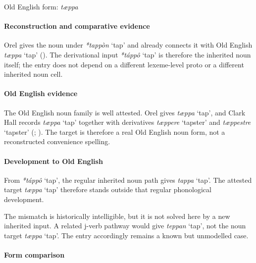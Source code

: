 \documentclass[
  british,
  a4paper,
]{article}
\providecommand{\Recon}[1]{\emph{*#1}}
\begin{document}
Old English form: \emph{tæppa}

\paragraph{Reconstruction and comparative
evidence}\label{reconstruction-and-comparative-evidence-148}

Orel gives the noun under \Recon{tappòn} `tap' and already connects it
with Old English {\emph{tæppa}} `tap' (). The derivational input \Recon{táppô} `tap' is therefore the
inherited noun itself; the entry does not depend on a different
lexeme-level proto or a different inherited noun cell.

\paragraph{Old English evidence}\label{old-english-evidence-148}

The Old English noun family is well attested. Orel gives {\emph{tæppa}}
`tap', and Clark Hall records {\emph{tæppa}} `tap' together with
derivatives \emph{tæppere} `tapster' and \emph{tæppestre} `tapster'
(;
). The target is
therefore a real Old English noun form, not a reconstructed convenience
spelling.

\paragraph{Development to Old
English}\label{development-to-old-english-148}

From \Recon{táppô} `tap', the regular inherited noun path gives
{\emph{tappa}} `tap'. The attested target {\emph{tæppa}} `tap' therefore
stands outside that regular phonological development.

The mismatch is historically intelligible, but it is not solved here by
a new inherited input. A related j-verb pathway would give
{\emph{teppan}} `tap', not the noun target {\emph{tæppa}} `tap'. The
entry accordingly remains a known but unmodelled case.

\paragraph{Form comparison}\label{form-comparison-6}
\end{document}
